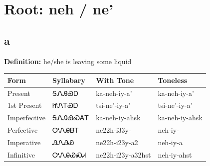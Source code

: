 \documentclass{article}%
\begin{document}
%
\normalsize%
\section*{Root: neh / ne'}%
\subsection*{a}%
\textbf{Definition: }%
he/she is leaving some liquid%
\\[0.5em]%
\begin{tabular}{|l|l|l|l|}%
\hline%
\textbf{Form}&\textbf{Syllabary}&\textbf{With Tone}&\textbf{Toneless}\\%
\hline%
Present&ᎦᏁᎯᏯᎠ&ka{-}neh{-}iy{-}a'&ka{-}neh{-}iy{-}a'\\%
1st Present&ᏥᏁᎢᏯᎠ&tsi{-}ne'{-}iy{-}a'&tsi{-}ne'{-}iy{-}a'\\%
Imperfective&ᎦᏁᎯᏯᏍᎪᎢ&ka{-}neh{-}iy{-}ahsk&ka{-}neh{-}iy{-}ahsk\\%
Perfective&ᎤᏁᎯᏴᎢ&ne22h{-}i33y{-}&neh{-}iy{-}\\%
Imperative&ᎯᏁᎯᏯ&ne22h{-}i23y{-}a2&neh{-}iy{-}a\\%
Infinitive&ᎤᏁᎯᏯᏍᏗ&ne22h{-}i23y{-}a32hst&neh{-}iy{-}ahst\\%
\hline%
\end{tabular}%
\\[1em]%
\end{document}
